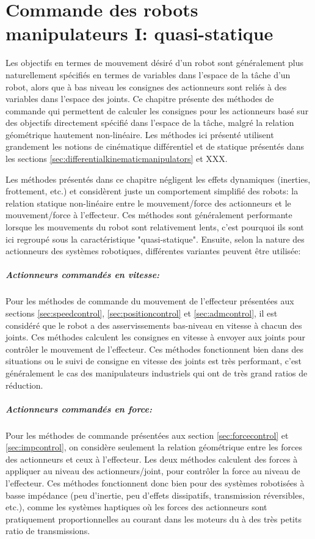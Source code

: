 \chapter{Commande des robots manipulateurs I: quasi-statique}
\label{sec:staticcontrol}


Les objectifs en termes de mouvement désiré d'un robot sont généralement plus naturellement spécifiés en termes de variables dans l'espace de la tâche d'un robot, alors que à bas niveau les consignes des actionneurs sont reliés à des variables dans l'espace des joints. Ce chapitre présente des méthodes de commande qui permettent de calculer les consignes pour les actionneurs basé sur des objectifs directement spécifié dans l'espace de la tâche, malgré la relation géométrique hautement non-linéaire. Les méthodes ici présenté utilisent grandement les notions de cinématique différentiel et de statique présentés dans les sections \ref{sec:differentialkinematicmanipulators} et XXX.

Les méthodes présentés dans ce chapitre négligent les effets dynamiques (inerties, frottement, etc.) et considèrent juste un comportement simplifié des robots: la relation statique non-linéaire entre le mouvement/force des actionneurs et le mouvement/force à l'effecteur. Ces méthodes sont généralement performante lorsque les mouvements du robot sont relativement lents, c'est pourquoi ils sont ici regroupé sous la caractéristique "quasi-statique". Ensuite, selon la nature des actionneurs des systèmes robotiques, différentes variantes peuvent être utilisée:

\paragraph{Actionneurs commandés en vitesse:} Pour les méthodes de commande du mouvement de l'effecteur présentées aux sections \ref{sec:speedcontrol}, \ref{sec:positioncontrol} et \ref{sec:admcontrol}, il est considéré que le robot a des asservissements bas-niveau en vitesse à chacun des joints. Ces méthodes calculent les consignes en vitesse à envoyer aux joints pour contrôler le mouvement de l'effecteur. Ces méthodes fonctionnent bien dans des situations ou le suivi de consigne en vitesse des joints est très performant, c'est généralement le cas des manipulateurs industriels qui ont de très grand ratios de réduction. 

\paragraph{Actionneurs commandés en force:} Pour les méthodes de commande présentées aux section \ref{sec:forcecontrol} et \ref{sec:impcontrol}, on considère seulement la relation géométrique entre les forces des actionneurs et ceux à l'effecteur. Les deux méthodes calculent des forces à appliquer au niveau des actionneurs/joint, pour contrôler la force au niveau de l'effecteur. Ces méthodes fonctionnent donc bien pour des systèmes robotisées à basse impédance (peu d'inertie, peu d'effets dissipatifs, transmission réversibles, etc.), comme les systèmes haptiques où les forces des actionneurs sont pratiquement proportionnelles au courant dans les moteurs du à des très petits ratio de transmissions.



